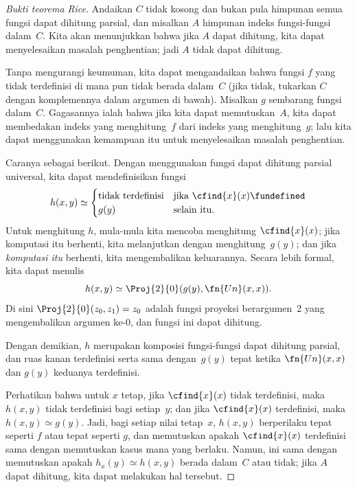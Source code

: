 \documentclass[../../../include/open-logic-section]{subfiles}
\begin{document}
\begin{proof}[Bukti teorema Rice]
Andaikan $C$ tidak kosong dan bukan pula himpunan semua fungsi dapat dihitung
parsial, dan misalkan $A$ himpunan indeks fungsi-fungsi dalam~$C$. Kita akan
menunjukkan bahwa jika $A$ dapat dihitung, kita dapat menyelesaikan masalah
penghentian; jadi $A$ tidak dapat dihitung.

Tanpa mengurangi keumuman, kita dapat mengandaikan bahwa fungsi $f$ yang tidak
terdefinisi di mana pun tidak berada dalam~$C$ (jika tidak, tukarkan $C$
dengan komplemennya dalam argumen di bawah). Misalkan $g$ sembarang fungsi
dalam~$C$. Gagasannya ialah bahwa jika kita dapat memutuskan~$A$, kita dapat
membedakan indeks yang menghitung~$f$ dari indeks yang menghitung~$g$; lalu
kita dapat menggunakan kemampuan itu untuk menyelesaikan masalah penghentian.

Caranya sebagai berikut. Dengan menggunakan fungsi dapat dihitung parsial
universal, kita dapat mendefinisikan fungsi
\[
h(x,y) \simeq
\begin{cases}
\text{tidak terdefinisi} & \text{jika $\cfind{x}(x) \fundefined$} \\
g(y) & \text{selain itu.}
\end{cases}
\]
Untuk menghitung $h$, mula-mula kita mencoba menghitung $\cfind{x}(x)$; jika
komputasi itu berhenti, kita melanjutkan dengan menghitung~$g(y)$; dan jika
\emph{komputasi itu} berhenti, kita mengembalikan keluarannya. Secara lebih
formal, kita dapat menulis
\[
h(x,y) \simeq \Proj{2}{0}(g(y),\fn{Un}(x,x)).
\]
Di sini $\Proj{2}{0}(z_0,z_1)=z_0$ adalah fungsi proyeksi berargumen~2 yang
mengembalikan argumen ke-$0$, dan fungsi ini dapat dihitung.

Dengan demikian, $h$ merupakan komposisi fungsi-fungsi dapat dihitung parsial,
dan ruas kanan terdefinisi serta sama dengan~$g(y)$ tepat ketika
$\fn{Un}(x,x)$ dan $g(y)$ keduanya terdefinisi.

Perhatikan bahwa untuk $x$ tetap, jika $\cfind{x}(x)$ tidak terdefinisi, maka
$h(x,y)$ tidak terdefinisi bagi setiap~$y$; dan jika $\cfind{x}(x)$
terdefinisi, maka $h(x,y) \simeq g(y)$. Jadi, bagi setiap nilai tetap~$x$,
$h(x,y)$ berperilaku tepat seperti $f$ atau tepat seperti $g$, dan memutuskan
apakah $\cfind{x}(x)$ terdefinisi sama dengan memutuskan kasus mana yang
berlaku. Namun, ini sama dengan memutuskan apakah $h_x(y) \simeq h(x,y)$
berada dalam~$C$ atau tidak; jika $A$ dapat dihitung, kita dapat melakukan
hal tersebut.


\end{proof}
\end{document}

